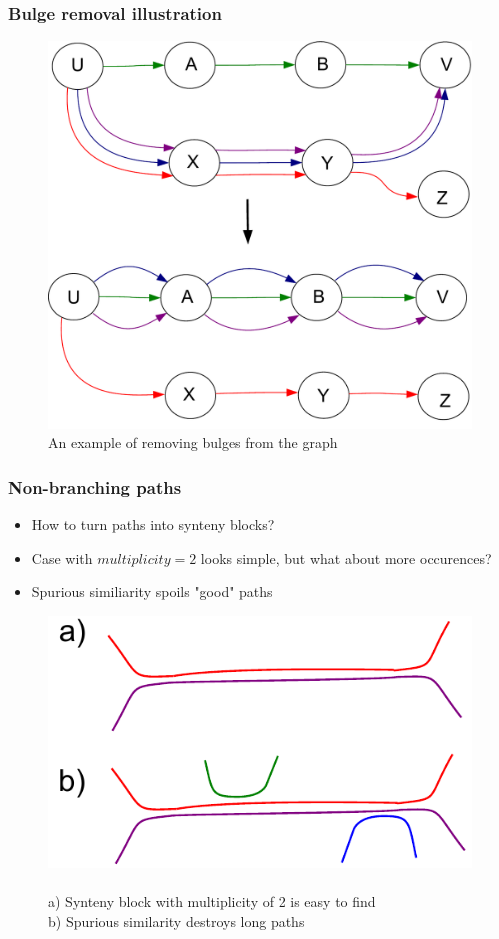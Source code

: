 \documentclass[svgnames,14pt]{beamer}
\begin{document}
\begin{frame}
\frametitle{Bulge removal illustration}
\begin{figure}
\centering
\includegraphics[scale = 0.400]{Figure3.pdf}
\small \caption{An example of removing bulges from the graph}
\end{figure}
\end{frame}

\begin{frame}
\frametitle{Non-branching paths}
\begin{itemize}
\item How to turn paths into synteny blocks?
\item Case with \( multiplicity = 2 \) looks simple, but what about more occurences?
\item Spurious similiarity spoils "good" paths
\end{itemize}
\begin{figure}
\centering
\includegraphics[scale = 0.72]{Figure4.pdf}
\small \caption{\\a) Synteny block with multiplicity of 2 is easy to find \\ b) Spurious similarity destroys long paths}
\end{figure}
\end{frame}
\end{document}
